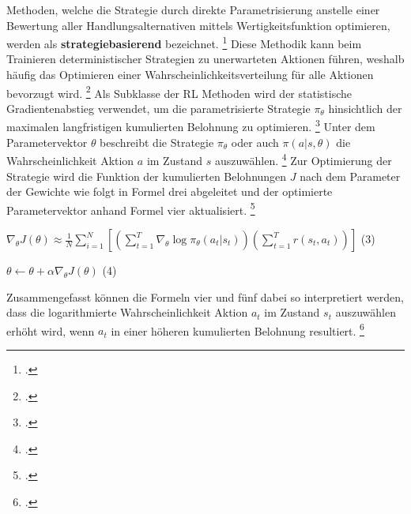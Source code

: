 Methoden, welche die Strategie durch direkte Parametrisierung anstelle einer Bewertung aller Handlungsalternativen mittels Wertigkeitsfunktion optimieren, werden als \textbf{strategiebasierend} bezeichnet. \footcite[Vgl.][S. 2]{Zhang.2018}
Diese Methodik kann beim Trainieren deterministischer Strategien zu unerwarteten Aktionen führen, weshalb häufig das Optimieren einer Wahrscheinlichkeitsverteilung für alle Aktionen bevorzugt wird. \footcite[Vgl.][S. 3]{Ningombam.2022}
Als Subklasse der RL Methoden wird der statistische Gradientenabstieg verwendet, um die parametrisierte Strategie $\pi_{\theta}$ hinsichtlich der maximalen langfristigen kumulierten Belohnung zu optimieren. \footcite[Vgl.][S. 3]{Ningombam.2022}
Unter dem Parametervektor $\theta$ beschreibt die Strategie $\pi_{\theta}$ oder auch $\pi(a|s,\theta)$ die Wahrscheinlichkeit Aktion $a$ im Zustand $s$ auszuwählen. \footcite[Vgl.][S. 321]{Sutton.2018}
Zur Optimierung der Strategie wird die Funktion der kumulierten Belohnungen $J$ nach dem Parameter der Gewichte wie folgt in Formel drei abgeleitet und der optimierte Parametervektor anhand Formel vier aktualisiert. \footcite[Vgl.][S. 6]{Wang.2020}
\begin{description}
    \item \begin{center} $\nabla_{\theta}J(\theta) \approx \frac{1}{N} \sum \limits_{i=1}^{N} \left[(\sum \limits_{t=1}^{T} \nabla_{\theta}\log\pi_{\theta}(a_{t}|s_{t}))(\sum \limits_{t=1}^{T} r(s_{t},a_{t}))\right]$ (3)\end{center}
    \item \begin{center} $\theta \leftarrow \theta + \alpha\nabla_{\theta}J(\theta)$ (4)\end{center}
\end{description}
Zusammengefasst können die Formeln vier und fünf dabei so interpretiert werden, dass die logarithmierte Wahrscheinlichkeit Aktion $a_{t}$ im Zustand $s_{t}$ auszuwählen erhöht wird, wenn $a_{t}$ in einer höheren kumulierten Belohnung resultiert. \footcite[Vgl.][S. 6]{Wang.2020}


